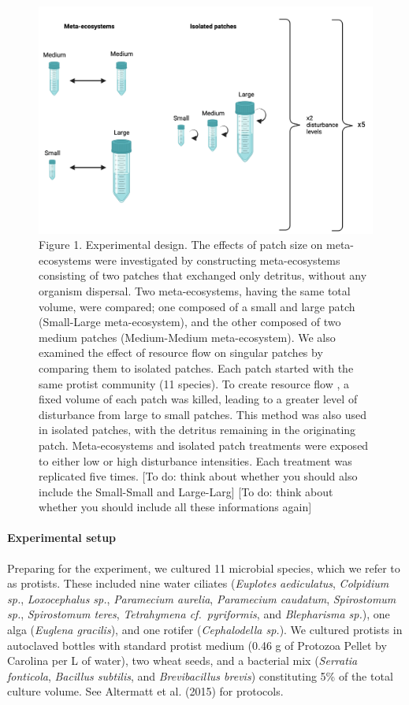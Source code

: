 \documentclass[
]{article}
\begin{document}
\begin{figure}
\centering
\includegraphics{images/Design.png}
\caption{Figure 1. Experimental design. The effects of patch size on
meta-ecosystems were investigated by constructing meta-ecosystems
consisting of two patches that exchanged only detritus, without any
organism dispersal. Two meta-ecosystems, having the same total volume,
were compared; one composed of a small and large patch (Small-Large
meta-ecosystem), and the other composed of two medium patches
(Medium-Medium meta-ecosystem). We also examined the effect of resource
flow on singular patches by comparing them to isolated patches. Each
patch started with the same protist community (11 species). To create
resource flow , a fixed volume of each patch was killed, leading to a
greater level of disturbance from large to small patches. This method
was also used in isolated patches, with the detritus remaining in the
originating patch. Meta-ecosystems and isolated patch treatments were
exposed to either low or high disturbance intensities. Each treatment
was replicated five times. {[}To do: think about whether you should also
include the Small-Small and Large-Larg{]} {[}To do: think about whether
you should include all these informations again{]}}
\end{figure}

\hypertarget{experimental-setup}{%
\paragraph{Experimental setup}\label{experimental-setup}}

Preparing for the experiment, we cultured 11 microbial species, which we
refer to as protists. These included nine water ciliates (\emph{Euplotes
aediculatus}, \emph{Colpidium sp.}, \emph{Loxocephalus sp.},
\emph{Paramecium aurelia}, \emph{Paramecium caudatum}, \emph{Spirostomum
sp.}, \emph{Spirostomum teres}, \emph{Tetrahymena cf.~pyriformis}, and
\emph{Blepharisma sp.}), one alga (\emph{Euglena gracilis}), and one
rotifer (\emph{Cephalodella sp.}). We cultured protists in autoclaved
bottles with standard protist medium (0.46 g of Protozoa Pellet by
Carolina per L of water), two wheat seeds, and a bacterial mix
(\emph{Serratia fonticola}, \emph{Bacillus subtilis}, and
\emph{Brevibacillus brevis}) constituting 5\% of the total culture
volume. See Altermatt et al. (2015) for protocols.
\end{document}
